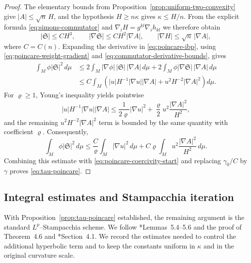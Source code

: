\documentclass[11pt,reqno]{amsart}
\theoremstyle{definition}
\theoremstyle{remark}
\numberwithin{equation}{section}
\begin{document}
\begin{proof}
The elementary bounds from Proposition~\ref{prop:uniform-two-convexity}
give $|A|\leq\sqrt n\,H$, and the hypothesis $H\geq n\kappa$ gives
$\kappa\leq H/n$.  From the explicit formula
\eqref{eq:simons-commutator} and
$\nabla_iH=g^{kl}\nabla_i h_{kl}$ we therefore obtain
\begin{equation}\label{eq:commutator-derivative-bounds}
 |\mathfrak S|\leq C H^3,
 \qquad
 |\nabla\mathfrak S|\leq C H^2|\nabla A|,
 \qquad
 |\nabla H|\leq\sqrt n\,|\nabla A|,
\end{equation}
where $C=C(n)$.  Expanding the derivative in
\eqref{eq:poincare-ibp}, using
\eqref{eq:poincare-weight-gradient} and
\eqref{eq:commutator-derivative-bounds}, gives
\begin{align*}
 \int_M\phi|\mathfrak S|^2\,d\mu
 &\leq 2\int_M|\nabla\phi|\,|\mathfrak S|\,|\nabla A|\,d\mu
       +2\int_M\phi|\nabla\mathfrak S|\,|\nabla A|\,d\mu\\
 &\leq C\int_M\left(
 |u|H^{-1}|\nabla u||\nabla A|
 +u^2H^{-2}|\nabla A|^2\right)d\mu.
\end{align*}
For $\varrho\geq1$, Young's inequality yields pointwise
\begin{equation*}
 |u|H^{-1}|\nabla u||\nabla A|
 \leq\frac1{2\varrho}|\nabla u|^2
      +\frac{\varrho}{2}u^2\frac{|\nabla A|^2}{H^2},
\end{equation*}
and the remaining $u^2H^{-2}|\nabla A|^2$ term is bounded by the same
quantity with coefficient $\varrho$.  Consequently,
\begin{equation*}
 \int_M\phi|\mathfrak S|^2\,d\mu
 \leq \frac{C}{\varrho}\int_M|\nabla u|^2\,d\mu
       +C\varrho\int_Mu^2\frac{|\nabla A|^2}{H^2}\,d\mu.
\end{equation*}
Combining this estimate with \eqref{eq:poincare-coercivity-start} and
replacing $\gamma_0/C$ by $\gamma$ proves \eqref{eq:tau-poincare}.
\end{proof}

\subsection{Integral estimates and Stampacchia iteration}

With Proposition~\ref{prop:tau-poincare} established, the remaining argument
is the standard $L^p$--Stampacchia scheme.  We follow
\cite{HS09}*{Lemmas~5.4--5.6 and the proof of Theorem~4.6} and
\cite{LN21}*{Section~4.1}.  We record the estimates needed to control the
additional hyperbolic term and to keep the constants uniform in $\kappa$ and
in the original curvature scale.
\end{document}
